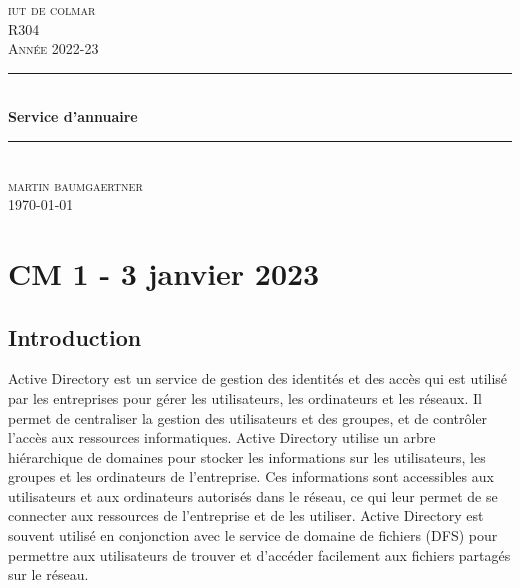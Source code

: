 \documentclass[12pt, a4paper]{article}
\begin{document}
\begin{titlepage}
	\newcommand{\HRule}{\rule{\linewidth}{0.5mm}} 
	\center 
	\textsc{\LARGE iut de colmar}\\[6.5cm] 
	\textsc{\Large R304}\\[0.5cm] 
	\textsc{\large Année 2022-23}\\[0.5cm]
	\HRule\\[0.75cm]
	{\huge\bfseries Service d'annuaire}\\[0.4cm]
	\HRule\\[1.5cm]
	\textsc{\large martin baumgaertner}\\[6.5cm] 

	\vfill\vfill\vfill
	{\large\today} 
	\vfill
\end{titlepage}
\newpage
\tableofcontents
\newpage
\section{CM 1 - 3 janvier 2023}
\subsection{Introduction}
Active Directory est un service de gestion des identités et des accès qui est 
utilisé par les entreprises pour gérer les utilisateurs, les ordinateurs et les 
réseaux. Il permet de centraliser la gestion des utilisateurs et des groupes, et 
de contrôler l'accès aux ressources informatiques. Active Directory utilise un 
arbre hiérarchique de domaines pour stocker les informations sur les 
utilisateurs, les groupes et les ordinateurs de l'entreprise. Ces 
informations sont accessibles aux utilisateurs et aux ordinateurs autorisés 
dans le réseau, ce qui leur permet de se connecter aux ressources de l'entreprise 
et de les utiliser. Active Directory est souvent utilisé en conjonction avec le 
service de domaine de fichiers (DFS) pour permettre aux utilisateurs de trouver 
et d'accéder facilement aux fichiers partagés sur le réseau.
\end{document}
